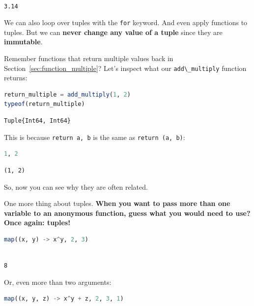 \documentclass[
  notoc %
]{tufte-book}
\newcommand{\passthrough}[1]{#1}
\begin{document}
\begin{lstlisting}[language=Output]

3.14

\end{lstlisting}

We can also loop over tuples with the \passthrough{\lstinline!for!}
keyword. And even apply functions to tuples. But we can \textbf{never
change any value of a tuple} since they are \textbf{immutable}.

Remember functions that return multiple values back in
Section~\ref{sec:function_multiple}? Let's inspect what our
\passthrough{\lstinline!add\_multiply!} function returns:

\begin{lstlisting}[language=Julia]
return_multiple = add_multiply(1, 2)
typeof(return_multiple)
\end{lstlisting}

\begin{lstlisting}[language=Output]
Tuple{Int64, Int64}
\end{lstlisting}

This is because \passthrough{\lstinline!return a, b!} is the same as
\passthrough{\lstinline!return (a, b)!}:

\begin{lstlisting}[language=Julia]
1, 2
\end{lstlisting}

\begin{lstlisting}[language=Output]
(1, 2)
\end{lstlisting}

So, now you can see why they are often related.

One more thing about tuples. \textbf{When you want to pass more than one
variable to an anonymous function, guess what you would need to use?
Once again: tuples!}

\begin{lstlisting}[language=Julia]
map((x, y) -> x^y, 2, 3)
\end{lstlisting}

\begin{lstlisting}[language=Output]

8

\end{lstlisting}

Or, even more than two arguments:

\begin{lstlisting}[language=Julia]
map((x, y, z) -> x^y + z, 2, 3, 1)
\end{lstlisting}
\end{document}
